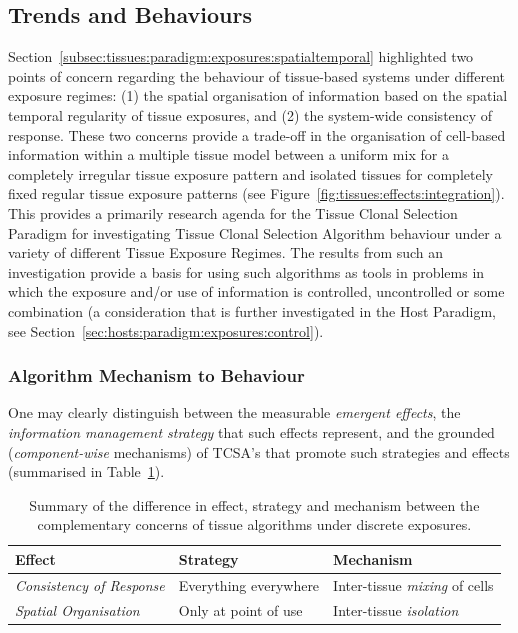 \subsection{Trends and Behaviours}
\label{subsec:tissues:paradigm:method:behaviours}
Section~\ref{subsec:tissues:paradigm:exposures:spatialtemporal} highlighted two points of concern regarding the behaviour of tissue-based systems under different exposure regimes: (1) the spatial organisation of information based on the spatial temporal regularity of tissue exposures, and (2) the system-wide consistency of response. These two concerns provide a trade-off in the organisation of cell-based information within a multiple tissue model between a uniform mix for a completely irregular tissue exposure pattern and isolated tissues for completely fixed regular tissue exposure patterns (see Figure~\ref{fig:tissues:effects:integration}). This provides a primarily research agenda for the Tissue Clonal Selection Paradigm for investigating Tissue Clonal Selection Algorithm behaviour under a variety of different Tissue Exposure Regimes. The results from such an investigation provide a basis for using such algorithms as tools in problems in which the exposure and/or use of information is controlled, uncontrolled or some combination (a consideration that is further investigated in the Host Paradigm, see Section~\ref{sec:hosts:paradigm:exposures:control}).

%
%
\subsubsection{Algorithm Mechanism to Behaviour}
One may clearly distinguish between the measurable \emph{emergent effects}, the \emph{information management strategy} that such effects represent, and the grounded (\emph{component-wise} mechanisms) of TCSA's that promote such strategies and effects (summarised in Table~\ref{tab:tissues:trends:mechanism:behaviour}). 

\begin{table}[ht]
	\centering\small
		\begin{tabular}{lll}
		\toprule
		\textbf{Effect} & \textbf{Strategy} & \textbf{Mechanism} \\ 
		\toprule
		\emph{Consistency of Response} & Everything everywhere & Inter-tissue \emph{mixing} of cells \\ 
		\emph{Spatial Organisation} & Only at point of use & Inter-tissue \emph{isolation} \\ 
		\bottomrule
		\end{tabular}
	\caption{Summary of the difference in effect, strategy and mechanism between the complementary concerns of tissue algorithms under discrete exposures.}
	\label{tab:tissues:trends:mechanism:behaviour}
\end{table}

